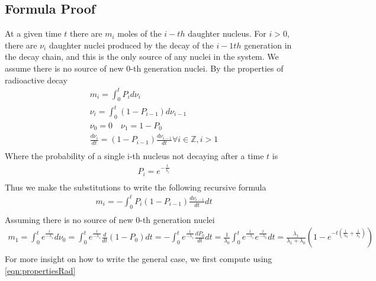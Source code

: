 \documentclass[12pt]{article}
\begin{document}
\subsection{Formula Proof}
At a given time $t$ there are $m_i$ moles of the $i-th$ daughter nucleus. For $i>0$, there are $\nu_{i}$ daughter nuclei produced by the decay of the $i-1th$ generation in the decay chain, and this is the only source of any nuclei in the system. We assume there is no source of new 0-th generation nuclei. By the properties of radioactive decay
\begin{equation}\label{eqn:propertiesRad}
\begin{split}
m_i = \int_0^t P_id\nu_{i}\\
\nu_i = \int_0^t (1-P_{i-1})d\nu_{i-1}\\
\nu_0 = 0\quad \nu_1 = 1-P_0\\
\frac{d\nu_{i}}{dt} = (1-P_{i-1})\frac{d\nu_{i-1}}{dt}\forall i\in\mathbb{Z}, i>1\\
\end{split}
\end{equation}
Where the probability of a single i-th nucleus not decaying after a time $t$ is
\begin{equation}
\begin{split}
P_i = e^{-\frac{t}{\lambda_{i}}}\\
\end{split}
\end{equation}
Thus we make the substitutions to write the following recursive formula
\begin{equation}\label{eqn:recursiveForm}
\begin{split}
m_i = -\int_0^t P_i(1-P_{i-1})\frac{d\nu_{i-1}}{dt}dt\\
\end{split}
\end{equation}
Assuming there is no source of new 0-th generation nuclei
\begin{equation}
\begin{split}
m_1 = \int_0^te^{\frac{t}{-\lambda_1}}d\nu_0 = \int_0^te^{\frac{t}{-\lambda_1}}\frac{d}{dt}(1-P_0)dt = -\int_0^te^{\frac{t}{-\lambda_1}}\frac{dP_0}{dt}dt = \frac{1}{\lambda_0}\int_0^te^{\frac{t}{-\lambda_1}}e^{\frac{t}{-\lambda_0}}dt = \frac{\lambda_1}{\lambda_1+\lambda_0}(1-e^{-t(\frac{1}{\lambda_0}+\frac{1}{\lambda_1})}) \\
\end{split}
\end{equation}
For more insight on how to write the general case, we first compute using \ref{eqn:propertiesRad}
\end{document}
